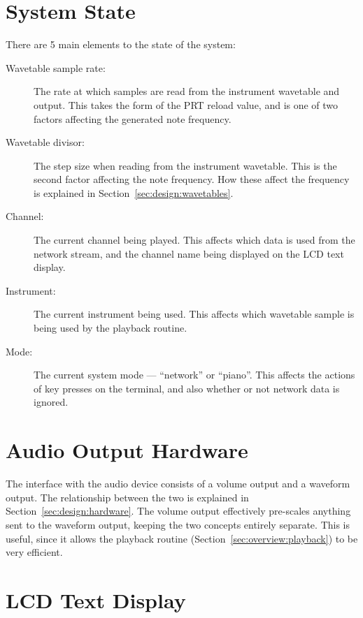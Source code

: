 \section{System State}
\label{sec:overview:state}

There are 5 main elements to the state of the system:

\begin{description}
\item[Wavetable sample rate:] The rate at which samples are read from the instrument wavetable and 
output.  This takes the form of the PRT reload value, and is one of two factors affecting the 
generated note frequency.
\item[Wavetable divisor:] The step size when reading from the instrument wavetable.  This is the 
second factor affecting the note frequency.  How these affect the frequency is explained in 
Section~\ref{sec:design:wavetables}.
\item[Channel:] The current channel being played.  This affects which data is used from the network 
stream, and the channel name being displayed on the LCD text display.
\item[Instrument:] The current instrument being used.  This affects which wavetable sample is being 
used by the playback routine.
\item[Mode:] The current system mode --- ``network'' or ``piano''.  This affects the actions of key 
presses on the terminal, and also whether or not network data is ignored.
\end{description}

\section{Audio Output Hardware}
\label{sec:overview:hardware}

The interface with the audio device consists of a volume output and a waveform output.  The 
relationship between the two is explained in Section~\ref{sec:design:hardware}.  The volume output 
effectively pre-scales anything sent to the waveform output, keeping the two concepts entirely 
separate.  This is useful, since it allows the playback routine 
(Section~\ref{sec:overview:playback}) to be very efficient.

\section{LCD Text Display}
\label{sec:overview:lcd}


